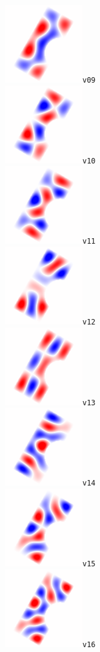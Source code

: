 \documentclass[a4paper,11pt]{article}
\begin{document}
\includegraphics[width=0.15\linewidth]{f/marimba_v09.png}\verb+v09+\\
\includegraphics[width=0.15\linewidth]{f/marimba_v10.png}\verb+v10+\\
\includegraphics[width=0.15\linewidth]{f/marimba_v11.png}\verb+v11+\\
\includegraphics[width=0.15\linewidth]{f/marimba_v12.png}\verb+v12+\\
\includegraphics[width=0.15\linewidth]{f/marimba_v13.png}\verb+v13+\\
\includegraphics[width=0.15\linewidth]{f/marimba_v14.png}\verb+v14+\\
\includegraphics[width=0.15\linewidth]{f/marimba_v15.png}\verb+v15+\\
\includegraphics[width=0.15\linewidth]{f/marimba_v16.png}\verb+v16+\\
\end{document}
